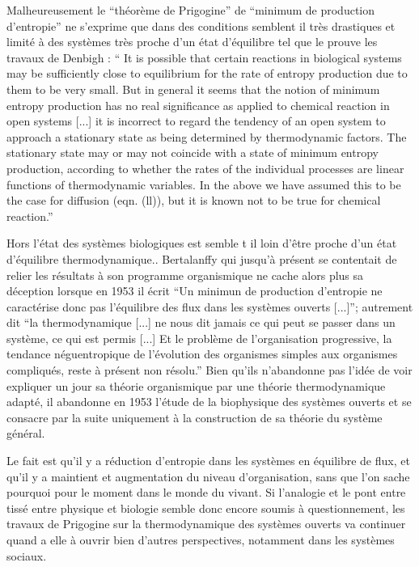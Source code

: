 Malheureusement le \enquote{théorème de Prigogine} de \enquote{minimum de production d'entropie} ne s'exprime que dans des conditions semblent il très drastiques \autocite[53]{Lebon2008} et limité à des systèmes très proche d'un état d'équilibre tel que le prouve les travaux de Denbigh : \enquote{ It is possible that certain reactions in biological systems may be sufficiently close to equilibrium for the rate of entropy production due to them to be very small. But in general it seems that the notion of minimum entropy production has no real significance as applied to chemical reaction in open systems [...] it is incorrect to regard the tendency of an open system to approach a stationary state as being determined by thermodynamic factors. The stationary state may or may not coincide with a state of minimum entropy production, according to whether the rates of the individual processes are linear functions of thermodynamic variables. In the above we have assumed this to be the case for diffusion (eqn. (ll)), but it is known not to be true for chemical reaction.} \autocite{Denbigh1952}

Hors l'état des systèmes biologiques est semble t il loin d'être proche d'un état d'équilibre thermodynamique.. Bertalanffy qui jusqu'à présent se contentait de relier les résultats à son programme organismique ne cache alors plus sa déception lorsque en 1953 il écrit \enquote{Un minimun de production d'entropie ne caractérise donc pas l'équilibre des flux dans les systèmes ouverts [...]}; autrement dit \enquote{la thermodynamique [...] ne nous dit jamais ce qui peut se passer dans un système, ce qui est permis [...] Et le problème de l'organisation progressive, la tendance néguentropique de l'évolution des organismes simples aux organismes compliqués, reste à présent non résolu.} Bien qu'ils n'abandonne pas l'idée de voir expliquer un jour sa théorie organismique par une théorie thermodynamique adapté, il abandonne en 1953 l'étude de la biophysique des systèmes ouverts et se consacre par la suite uniquement à la construction de sa théorie du système général.

Le fait est qu'il y a réduction d'entropie dans les systèmes en équilibre de flux, et qu'il y a maintient et augmentation du niveau d'organisation, sans que l'on sache pourquoi pour le moment dans le monde du vivant. Si l'analogie et le pont entre tissé entre physique et biologie semble donc encore soumis à questionnement, les travaux de Prigogine sur la thermodynamique des systèmes ouverts va continuer quand a elle à ouvrir bien d'autres perspectives, notamment dans les systèmes sociaux. 

